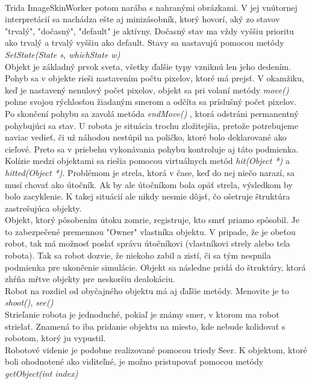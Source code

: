 \\
Trida ImageSkinWorker potom narába  s nahranými obrázkami. V jej vnútornej interpretácií sa nachádza ešte aj minizásobník, ktorý hovorí, aký zo stavov "trvalý", "dočasný", "default" je aktívny. Dočasný stav ma vždy vyššiu prioritu ako trvalý a trvalý vyššiu ako default. Stavy sa nastavujú pomocou metódy { \it SetState(State s, whichState w) }\\%
Objekt je základný prvok sveta, všetky ďalšie typy vzniknú len jeho dedením. \\
Pohyb sa v objekte rieši nastavením počtu pixelov, ktoré má prejsť. V okamžiku,  keď je nastavený nenulový počet pixelov, objekt sa pri volaní metódy {\it move()} pohne svojou rýchlosťou žiadaným smerom a odčíta sa  príslušný počet pixelov. Po skončení pohybu sa zavolá metóda {\it endMove()} , ktorá odstráni permanentný pohybujúci sa stav. U robota je situácia trochu zložitejšia, pretože potrebujeme naviac vedieť, či už náhodou nestúpil na poličko, ktoré bolo deklarované ako cieľové. Preto sa v priebehu vykonávania pohybu kontroluje aj táto podmienka. \\
Kolízie medzi objektami sa riešia pomocou virtuálnych metód {\it hit(Object *)} a {\it hitted(Object *)}. Problémom je strela, ktorá v čase, keď do nej niečo narazí, sa musí chovať ako útočník. Ak by ale útočníkom bola opäť strela, výsledkom by bolo zacyklenie. K takej situácií ale nikdy nesmie dôjsť, čo ošetruje štruktúra zastrešujúca objekty.\\
Objekt, ktorý pôsobením útoku zomrie, registruje, kto smrť priamo spôsobil. Je to zabezpečené premennou "Owner" vlastníka objektu. V pripade, že je obeťou robot, tak má možnosť poslať správu útočníkovi (vlastníkovi strely alebo tela robota). Tak sa robot dozvie, že niekoho zabil a zistí, či sa tým nespnila podmienka pre ukončenie simulácie. Objekt sa následne pridá do štruktúry, ktorá zhŕňa mŕtve objekty pre neskoršiu dealokáciu.\\
Robot na rozdiel od obyčajného objektu má aj ďaľšie metódy. Menovite je to {\it shoot()}, {\it see()}\\
Strieľanie robota je jednoduché, pokiaľ je známy smer, v ktorom ma robot strielať. Znamená to iba pridanie objektu na miesto, kde nebude kolidovať s robotom, ktorý ju vypustil.\\
Robotové videnie je podobne realizované pomocou triedy Seer.  K objektom, ktoré boli ohodnotené ako viditeľné, je možno pristupovať pomocou metódy {\it getObject(int index)}\\
